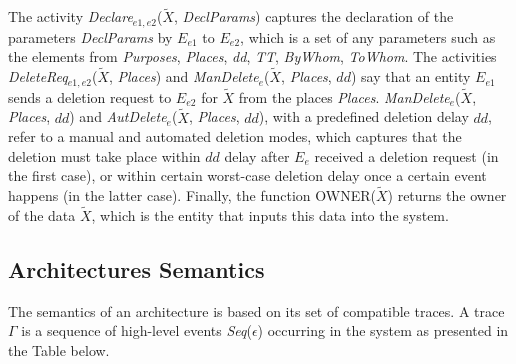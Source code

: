 \documentclass[a4paper]{article}
\begin{document}
 
 The activity \textit{Declare}$_{e1, e2}$($\tilde{X}$, \textit{DeclParams}) captures the declaration of the parameters  \textit{DeclParams} by $E_{e1}$ to $E_{e2}$, which is a set of any parameters such as the elements from \textit{Purposes}, \textit{Places}, \textit{dd}, \textit{TT}, \textit{ByWhom}, \textit{ToWhom}. The activities \textit{DeleteReq}$_{e1, e2}$($\tilde{X}$, \textit{Places}) and \textit{ManDelete}$_{e}$($\tilde{X}$, \textit{Places},  $dd$) say that an entity $E_{e1}$ sends a deletion request to $E_{e2}$ for $\tilde{X}$  from the places \textit{Places}. \textit{ManDelete}$_{e}$($\tilde{X}$, \textit{Places},  $dd$) and \textit{AutDelete}$_{e}$($\tilde{X}$, \textit{Places},  $dd$), with a predefined deletion delay $dd$, refer to a manual and automated deletion modes, which captures that the deletion must take place within $dd$ delay after $E_{e}$ received a deletion request (in the first case), or within certain worst-case deletion delay once a certain event happens (in the latter case).  Finally, the function OWNER($\tilde{X}$) returns the owner of the data $\tilde{X}$, which is the entity that inputs this data into the system.    



\subsection{Architectures Semantics}
\label{sec:semantics0}

The semantics of an architecture is based on its set of compatible traces. A trace $\Gamma$ is a sequence of high-level events 
\textit{Seq}($\epsilon$) occurring in the system as presented in the Table below.  
\end{document}
